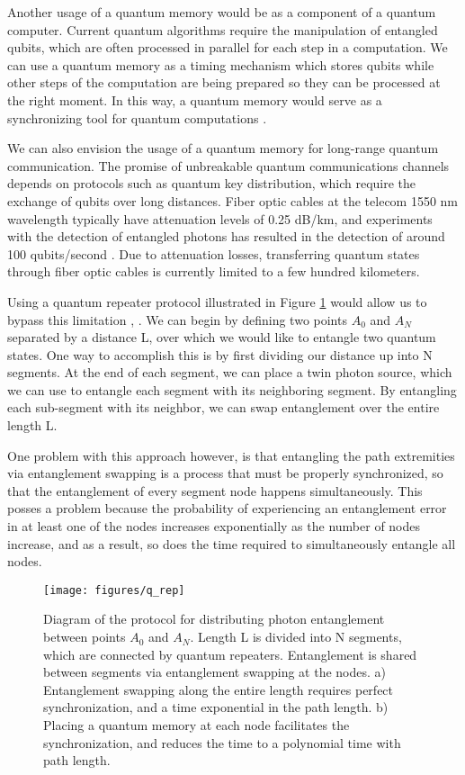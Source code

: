 Another usage of a quantum memory would be as a component of a quantum computer.  Current quantum algorithms require the manipulation of entangled qubits, which are often processed in parallel for each step in a computation. We can use a quantum memory as a timing mechanism which stores qubits while other steps of the computation are being prepared so they can be processed at the right moment.  In this way, a quantum memory would serve as a synchronizing tool for quantum computations \cite{lvovsky2009optical}. 

We can also envision the usage of a quantum memory for long-range quantum communication.  The promise of unbreakable quantum communications channels depends on protocols such as quantum key distribution, which require the exchange of qubits over long distances.  Fiber optic cables at the telecom 1550 nm wavelength typically have attenuation levels of 0.25 dB/km, and experiments with the detection of entangled photons has resulted in the detection of around 100 qubits/second \cite{Zeilinger07b}.  Due to attenuation losses, transferring quantum states through fiber optic cables is currently limited to a few hundred kilometers.


Using a quantum repeater protocol illustrated in Figure \ref{fig:q_rep} would
allow us to bypass this limitation \cite{Briegel98}, \cite{Duan01}.  We can
begin by defining two points $A_0$ and $A_N$ separated by a distance L, over
which we would like to entangle two quantum states.  One way to accomplish
this is by first dividing our distance up into N segments.  At the end of each segment, we can place a twin photon source, which we can use to entangle each segment with its neighboring segment.  By entangling each sub-segment with its neighbor, we can swap entanglement over the entire length L.

One problem with this approach however, is that entangling the path extremities via entanglement swapping is a process that must be properly synchronized, so that the entanglement of every segment node happens simultaneously.  This posses a problem because the probability of experiencing an entanglement error in at least one of the nodes increases exponentially as the number of nodes increase, and as a result, so does the time required to simultaneously entangle all nodes. 


\begin{figure}[!ht] 
 \centering 
 \texttt{[image: figures/q\_rep]} 
 \caption[Quantum repeater schematic]{Diagram of the protocol for
distributing photon entanglement between points $A_0$ and $A_N$.  Length L is
divided into N segments, which are connected by quantum repeaters.
Entanglement is shared between segments via entanglement swapping at the
nodes.  a)  Entanglement swapping along the entire length requires perfect
synchronization, and a time exponential in the path length.  b)  Placing a
quantum memory at each node facilitates the synchronization, and reduces the
time to a polynomial time with path length.} 
 \label{fig:q_rep} 
\end{figure}


